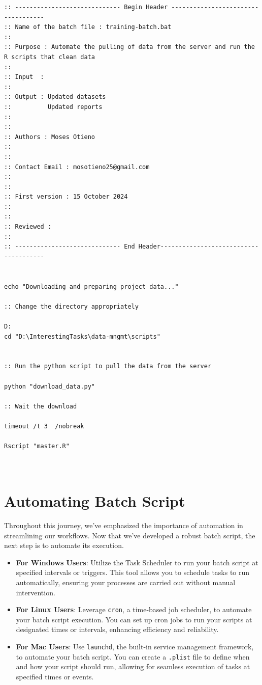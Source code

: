 \documentclass[
  letterpaper,
  DIV=11,
  numbers=noendperiod]{scrreprt}
\begin{document}
\begin{verbatim}
:: ----------------------------- Begin Header -----------------------------------
:: Name of the batch file : training-batch.bat
::
:: Purpose : Automate the pulling of data from the server and run the R scripts that clean data
::
:: Input  :  
::
:: Output : Updated datasets
::          Updated reports
::
::
:: Authors : Moses Otieno
::
::
:: Contact Email : mosotieno25@gmail.com
::
::
:: First version : 15 October 2024
::
::
:: Reviewed :
::
:: ----------------------------- End Header--------------------------------------


echo "Downloading and preparing project data..."

:: Change the directory appropriately

D:
cd "D:\InterestingTasks\data-mngmt\scripts"


:: Run the python script to pull the data from the server

python "download_data.py"

:: Wait the download

timeout /t 3  /nobreak  

Rscript "master.R"



\end{verbatim}

\section{Automating Batch Script}\label{automating-batch-script}

Throughout this journey, we've emphasized the importance of automation
in streamlining our workflows. Now that we've developed a robust batch
script, the next step is to automate its execution.

\begin{itemize}
\item
  \textbf{For Windows Users}: Utilize the Task Scheduler to run your
  batch script at specified intervals or triggers. This tool allows you
  to schedule tasks to run automatically, ensuring your processes are
  carried out without manual intervention.
\item
  \textbf{For Linux Users}: Leverage \texttt{cron}, a time-based job
  scheduler, to automate your batch script execution. You can set up
  cron jobs to run your scripts at designated times or intervals,
  enhancing efficiency and reliability.
\item
  \textbf{For Mac Users}: Use \texttt{launchd}, the built-in service
  management framework, to automate your batch script. You can create a
  \texttt{.plist} file to define when and how your script should run,
  allowing for seamless execution of tasks at specified times or events.
\end{itemize}
\end{document}
